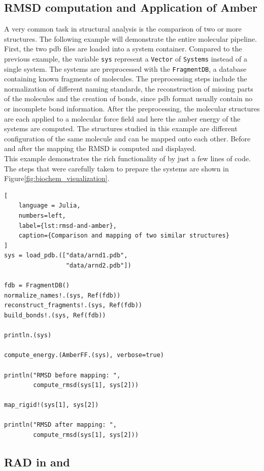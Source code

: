 \subsection{RMSD computation and Application of Amber}

A very common task in structural analysis is the comparison of two or more structures. The following example will demonstrate the entire molecular pipeline. First, the two pdb files are loaded into a system container. Compared to the previous example, the variable \texttt{sys} represent a \texttt{Vector} of \texttt{Systems} instead of a single system. The systems are preprocessed with the \texttt{FragmentDB}, a database containing known fragments of molecules. The preprocessing steps include the normalization of different naming standards, the reconstruction of missing parts of the molecules and the creation of bonds, since pdb format usually contain no or incomplete bond information.  After the preprocessing, the molecular structures are each applied to a molecular force field and here the amber energy of the systems are computed. The structures studied in this example are different configuration of the same molecule and can be mapped onto each other. Before and after the mapping the RMSD is computed and displayed.  \\
This example demonstrates the rich functionality of \biochem by just a few lines of code. The steps that were carefully taken to prepare the systems are shown in Figure\ref{fig:biochem_visualization}.
\begin{lstlisting}[
    language = Julia, 
    numbers=left, 
    label={lst:rmsd-and-amber}, 
    caption={Comparison and mapping of two similar structures}
]
sys = load_pdb.(["data/arnd1.pdb", 
				 "data/arnd2.pdb"])

fdb = FragmentDB()
normalize_names!.(sys, Ref(fdb))
reconstruct_fragments!.(sys, Ref(fdb))
build_bonds!.(sys, Ref(fdb))

println.(sys)

compute_energy.(AmberFF.(sys), verbose=true)

println("RMSD before mapping: ", 
		compute_rmsd(sys[1], sys[2]))

map_rigid!(sys[1], sys[2])

println("RMSD after mapping: ", 
		compute_rmsd(sys[1], sys[2]))
\end{lstlisting}

\subsection{RAD in \ball and \biochem}

